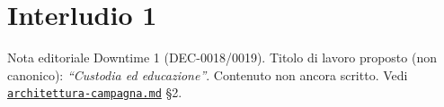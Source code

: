 \chapter*{Interludio 1}
\label{chap:interludio1}

\begin{DndComment}[]{Nota editoriale}
  Downtime 1 (DEC-0018/0019). Titolo di lavoro proposto (non canonico): \textit{``Custodia ed educazione''}. Contenuto non ancora scritto. Vedi \href{https://github.com/fpetrulio/child-of-balance/blob/main/docs/01-campaign-design/architettura-campagna.md}{\texttt{architettura-campagna.md}} §2.
\end{DndComment}
